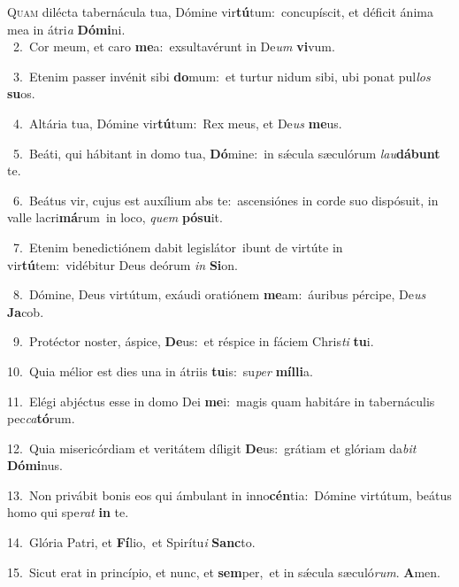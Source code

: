 \lettrine{\initial\textcolor{\initialcolor}{Q}}{uam} dilécta tabernácula tua, Dómine vir\-\textbf{tú}\-tum:~\star concupíscit, et déficit ánima mea in átri\textit{a} \textbf{Dó}\-\textbf{mi}ni.\\
{\numbfont\textcolor{\numbcolor}{~2.}}~Cor meum, et caro \textbf{me}\-a:~\star exsultavérunt in De\textit{um} \textbf{vi}\-vum.\par
{\numbfont\textcolor{\numbcolor}{~3.}}~Etenim passer invénit sibi \textbf{do}\-mum:~\star et turtur nidum sibi, ubi ponat pul\textit{los} \textbf{su}\-os.\par
{\numbfont\textcolor{\numbcolor}{~4.}}~Altária tua, Dómine vir\-\textbf{tú}\-tum:~\star Rex meus, et De\textit{us} \textbf{me}\-us.\par
{\numbfont\textcolor{\numbcolor}{~5.}}~Beáti, qui hábitant in domo tua, \textbf{Dó}\-mine:~\star in sǽcula sæculórum \textit{lau}\-\textbf{dá}\textbf{bunt} te.\par
{\numbfont\textcolor{\numbcolor}{~6.}}~Beátus vir, cujus est auxílium abs te:~\dagger ascensiónes in corde suo dispósuit, in valle lacri\-\textbf{má}\-rum~\star in loco, \textit{quem} \textbf{pó}\-\textbf{su}it.\par
{\numbfont\textcolor{\numbcolor}{~7.}}~Etenim benedictiónem dabit legislátor~\dagger ibunt de virtúte in vir\-\textbf{tú}\-tem:~\star vidébitur Deus deórum \textit{in} \textbf{Si}\-on.\par
{\numbfont\textcolor{\numbcolor}{~8.}}~Dómine, Deus virtútum, exáudi oratiónem \textbf{me}\-am:~\star áuribus pércipe, De\textit{us} \textbf{Ja}\-cob.\par
{\numbfont\textcolor{\numbcolor}{~9.}}~Protéctor noster, áspice, \textbf{De}\-us:~\star et réspice in fáciem Chris\textit{ti} \textbf{tu}\-i.\par
{\numbfont\textcolor{\numbcolor}{10.}}~Quia mélior est dies una in átriis \textbf{tu}\-is:~\star su\textit{per} \textbf{míl}\-\textbf{li}a.\par
{\numbfont\textcolor{\numbcolor}{11.}}~Elégi abjéctus esse in domo Dei \textbf{me}\-i:~\star magis quam habitáre in tabernáculis pec\-\textit{ca}\-\textbf{tó}rum.\par
{\numbfont\textcolor{\numbcolor}{12.}}~Quia misericórdiam et veritátem díligit \textbf{De}\-us:~\star grátiam et glóriam da\textit{bit} \textbf{Dó}\-\textbf{mi}nus.\par
{\numbfont\textcolor{\numbcolor}{13.}}~Non privábit bonis eos qui ámbulant in inno\-\textbf{cén}\-tia:~\star Dómine virtútum, beátus homo qui spe\textit{rat} \textbf{in} te.\par
{\numbfont\textcolor{\numbcolor}{14.}}~Glória Patri, et \textbf{Fí}\-lio,~\star et Spirítu\textit{i} \textbf{Sanc}\-to.\par
{\numbfont\textcolor{\numbcolor}{15.}}~Sicut erat in princípio, et nunc, et \textbf{sem}\-per,~\star et in sǽcula sæculó\-\textit{rum}\-. \textbf{A}\-men.\par
